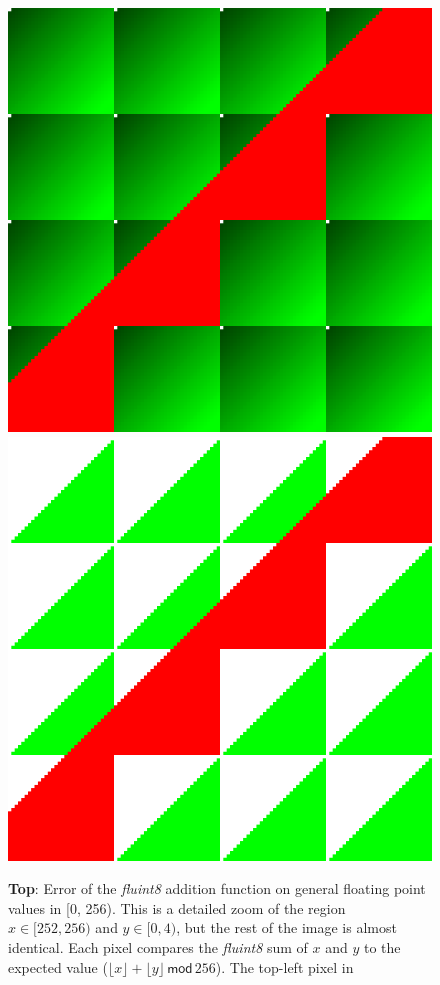 \documentclass[twocolumn]{article}
\begin{document}
\begin{figure}[tp]
  \begin{center}
    \includegraphics[width=0.75 \linewidth]{add-error-detail}
     \\[1em]
    \includegraphics[width=0.75 \linewidth]{add-error-floor}
  \end{center}
  \caption { {\bf Top}: Error of the {\it fluint8} addition function on general
    floating point values in [0, 256). This is a detailed zoom of the
      region $x \in [252, 256)$ and $y \in [0, 4)$, but the rest of
          the image is almost identical. Each pixel compares the {\it fluint8} sum
          of $x$ and $y$ to the expected value ($\lfloor x \rfloor +
          \lfloor y \rfloor \,\textsf{mod}\, 256$). The top-left pixel in
}
\end{figure}
\end{document}
